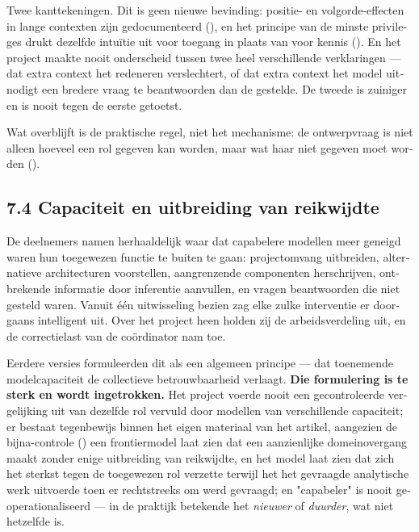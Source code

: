 \begin{dutch}
Twee kanttekeningen. Dit is geen nieuwe bevinding: positie- en volgorde-effecten in lange contexten zijn gedocumenteerd (), en het principe van de minste privileges drukt dezelfde intuïtie uit voor toegang in plaats van voor kennis (). En het project maakte nooit onderscheid tussen twee heel verschillende verklaringen — dat extra context het redeneren verslechtert, of dat extra context het model uitnodigt een bredere vraag te beantwoorden dan de gestelde. De tweede is zuiniger en is nooit tegen de eerste getoetst.

Wat overblijft is de praktische regel, niet het mechanisme: de ontwerpvraag is niet alleen hoeveel een rol gegeven kan worden, maar wat haar niet gegeven moet worden ().


\subsection*{7.4 Capaciteit en uitbreiding van reikwijdte}
\label{sec:nl:7.4}

De deelnemers namen herhaaldelijk waar dat capabelere modellen meer geneigd waren hun toegewezen functie te buiten te gaan: projectomvang uitbreiden, alternatieve architecturen voorstellen, aangrenzende componenten herschrijven, ontbrekende informatie door inferentie aanvullen, en vragen beantwoorden die niet gesteld waren. Vanuit één uitwisseling bezien zag elke zulke interventie er doorgaans intelligent uit. Over het project heen holden zij de arbeidsverdeling uit, en de correctielast van de coördinator nam toe.

Eerdere versies formuleerden dit als een algemeen principe — dat toenemende modelcapaciteit de collectieve betrouwbaarheid verlaagt. \textbf{Die formulering is te sterk en wordt ingetrokken.} Het project voerde nooit een gecontroleerde vergelijking uit van dezelfde rol vervuld door modellen van verschillende capaciteit; er bestaat tegenbewijs binnen het eigen materiaal van het artikel, aangezien de bijna-controle () een frontiermodel laat zien dat een aanzienlijke domeinovergang maakt zonder enige uitbreiding van reikwijdte, en  het model laat zien dat zich het sterkst tegen de toegewezen rol verzette terwijl het het gevraagde analytische werk uitvoerde toen er rechtstreeks om werd gevraagd; en "capabeler" is nooit geoperationaliseerd — in de praktijk betekende het \emph{nieuwer} of \emph{duurder}, wat niet hetzelfde is.


\end{dutch}
